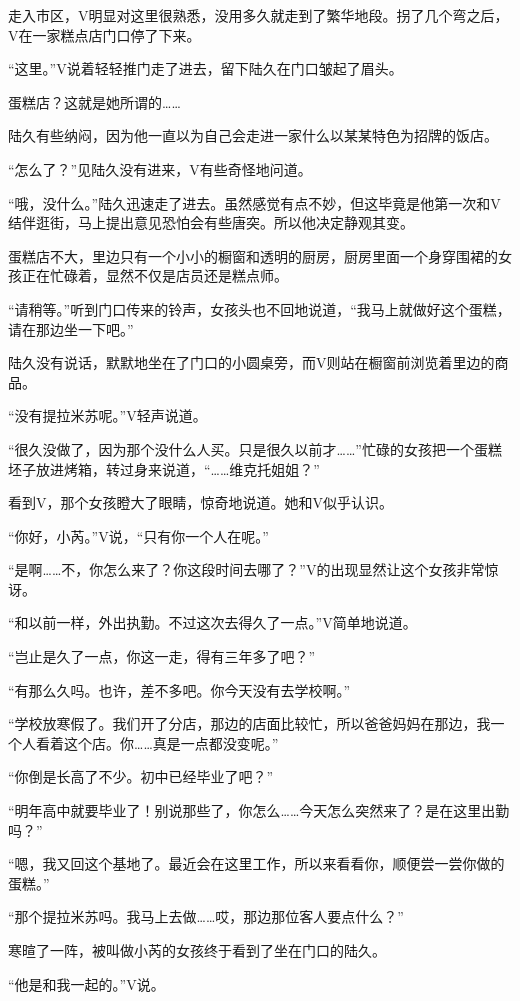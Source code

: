 走入市区，V明显对这里很熟悉，没用多久就走到了繁华地段。拐了几个弯之后，V在一家糕点店门口停了下来。

“这里。”V说着轻轻推门走了进去，留下陆久在门口皱起了眉头。

蛋糕店？这就是她所谓的……

陆久有些纳闷，因为他一直以为自己会走进一家什么以某某特色为招牌的饭店。

“怎么了？”见陆久没有进来，V有些奇怪地问道。

“哦，没什么。”陆久迅速走了进去。虽然感觉有点不妙，但这毕竟是他第一次和V结伴逛街，马上提出意见恐怕会有些唐突。所以他决定静观其变。

蛋糕店不大，里边只有一个小小的橱窗和透明的厨房，厨房里面一个身穿围裙的女孩正在忙碌着，显然不仅是店员还是糕点师。

“请稍等。”听到门口传来的铃声，女孩头也不回地说道，“我马上就做好这个蛋糕，请在那边坐一下吧。”

陆久没有说话，默默地坐在了门口的小圆桌旁，而V则站在橱窗前浏览着里边的商品。

“没有提拉米苏呢。”V轻声说道。

“很久没做了，因为那个没什么人买。只是很久以前才……”忙碌的女孩把一个蛋糕坯子放进烤箱，转过身来说道，“……维克托姐姐？”

看到V，那个女孩瞪大了眼睛，惊奇地说道。她和V似乎认识。

“你好，小芮。”V说，“只有你一个人在呢。”

“是啊……不，你怎么来了？你这段时间去哪了？”V的出现显然让这个女孩非常惊讶。

“和以前一样，外出执勤。不过这次去得久了一点。”V简单地说道。

“岂止是久了一点，你这一走，得有三年多了吧？”

“有那么久吗。也许，差不多吧。你今天没有去学校啊。”

“学校放寒假了。我们开了分店，那边的店面比较忙，所以爸爸妈妈在那边，我一个人看着这个店。你……真是一点都没变呢。”

“你倒是长高了不少。初中已经毕业了吧？”

“明年高中就要毕业了！别说那些了，你怎么……今天怎么突然来了？是在这里出勤吗？”

“嗯，我又回这个基地了。最近会在这里工作，所以来看看你，顺便尝一尝你做的蛋糕。”

“那个提拉米苏吗。我马上去做……哎，那边那位客人要点什么？”

寒暄了一阵，被叫做小芮的女孩终于看到了坐在门口的陆久。

“他是和我一起的。”V说。

